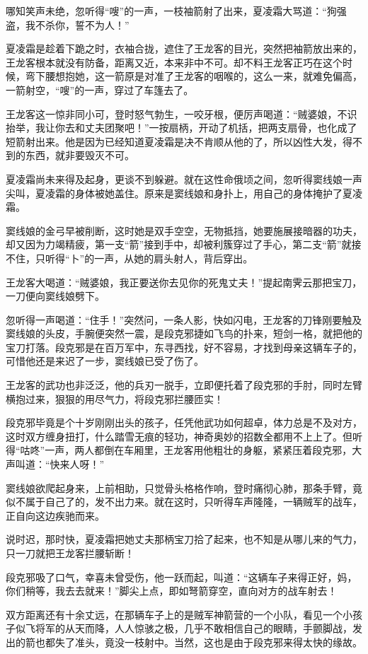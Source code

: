 \documentclass[12pt,oneside]{book}
\begin{document}
哪知笑声未绝，忽听得``嗖''的一声，一枝袖箭射了出来，夏凌霜大骂道：``狗强盗，我不杀你，誓不为人！''

夏凌霜是趁着下跪之时，衣袖合拢，遮住了王龙客的目光，突然把袖箭放出来的，王龙客根本就没有防备，距离又近，本来非中不可。却不料王龙客正巧在这个时候，弯下腰想抱她，这一箭原是对准了王龙客的咽喉的，这么一来，就难免偏高，一箭射空，``嗖''的一声，穿过了车篷去了。

王龙客这一惊非同小可，登时怒气勃生，一咬牙根，便厉声喝道：``贼婆娘，不识抬举，我让你去和丈夫团聚吧！''一按扇柄，开动了机括，把两支扇骨，也化成了短箭射出来。他是因为已经知道夏凌霜是决不肯顺从他的了，所以凶性大发，得不到的东西，就非要毁灭不可。

夏凌霜尚未来得及起身，更谈不到躲避。就在这性命俄顷之间，忽听得窦线娘一声尖叫，夏凌霜的身体被她盖住。原来是窦线娘和身扑上，用自己的身体掩护了夏凌霜。

窦线娘的金弓早被削断，这时她是双手空空，无物抵挡，她要施展接暗器的功夫，却又因为力竭精疲，第一支``箭''接到手中，却被利簇穿过了手心，第二支``箭''就接不住，只听得``卜''的一声，从她的肩头射人，背后穿出。

王龙客大喝道：``贼婆娘，我正要送你去见你的死鬼丈夫！''提起南霁云那把宝刀，一刀便向窦线娘劈下。

忽听得一声喝道：``住手！''突然问，一条人影，快如闪电，王龙客的刀锋刚要触及窦线娘的头皮，手腕便突然一震，是段克邪捷如飞鸟的扑来，短剑一格，就把他的宝刀打落。段克邪是在百万军中，东寻西找，好不容易，才找到母亲这辆车子的，可惜他还是来迟了一步，窦线娘已受了伤了。

王龙客的武功也非泛泛，他的兵刃一脱手，立即便托着了段克邪的手肘，同时左臂横抱过来，狠狠的用尽气力，将段克邪拦腰匝实！

段克邪毕竟是个十岁刚刚出头的孩子，任凭他武功如何超卓，体力总是不及对方，这时双方缠身扭打，什么踏雪无痕的轻功，神奇奥妙的招数全都用不上上了。但听得``咕咚''一声，两人都倒在车厢里，王龙客用他粗壮的身躯，紧紧压着段克邪，大声叫道：``快来人呀！''

窦线娘欲爬起身来，上前相助，只觉骨头格格作响，登时痛彻心肺，那条手臂，竟似不属于自己了的，发不出力来。就在这时，只听得车声隆隆，一辆贼军的战车，正自向这边疾驰而来。

说时迟，那时快，夏凌霜把她丈夫那柄宝刀拾了起来，也不知是从哪儿来的气力，只一刀就把王龙客拦腰斩断！

段克邪吸了口气，幸喜未曾受伤，他一跃而起，叫道：``这辆车子来得正好，妈，你们稍等，我去去就来！''脚尖上点，即如弩箭穿空，直向对方的战车射去！

双方距离还有十余丈远，在那辆车子上的是贼军神箭营的一个小队，看见一个小孩子似飞将军的从天而降，人人惊骇之极，几乎不敢相信自己的眼睛，手颤脚战，发出的箭也都失了准头，竟没一枝射中。当然，这也是由于段克邪来得太快的缘故。
\end{document}
